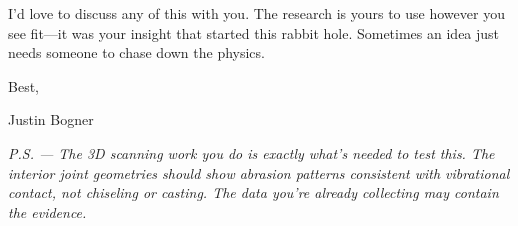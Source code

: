 \documentclass[11pt]{article}
\begin{document}
\vspace{0.5cm}

I'd love to discuss any of this with you. The research is yours to use however you see fit—it was your insight that started this rabbit hole. Sometimes an idea just needs someone to chase down the physics.

\vspace{0.8cm}

\noindent Best,

\vspace{0.3cm}

\noindent Justin Bogner

\vspace{0.6cm}

\noindent\textit{P.S. — The 3D scanning work you do is exactly what's needed to test this. The interior joint geometries should show abrasion patterns consistent with vibrational contact, not chiseling or casting. The data you're already collecting may contain the evidence.}
\end{document}
